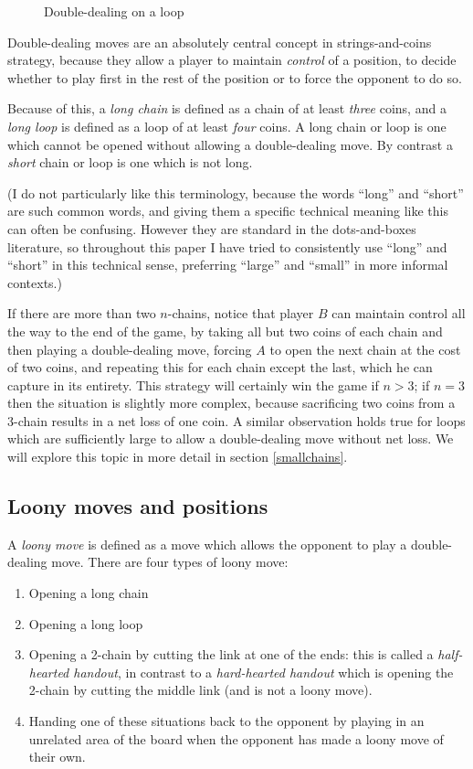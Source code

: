\documentclass[a4paper,twocolumn]{article}
\begin{document}
\begin{figure}
  \centering
  \def\svgscale{0.7}
  
  \caption{Double-dealing on a loop}
  \label{loopdoubledeal}
\end{figure}

Double-dealing moves are an absolutely central concept in
strings-and-coins strategy, because they allow a player to maintain
\emph{control} of a position, to decide whether to play first in the
rest of the position or to force the opponent to do so.

Because of this, a \emph{long chain} is defined as a chain of at least
\emph{three} coins, and a \emph{long loop} is defined as a loop of at
least \emph{four} coins. A long chain or loop is one which cannot be
opened without allowing a double-dealing move. By contrast a
\emph{short} chain or loop is one which is not long.

(I do not particularly like this terminology, because the words
``long'' and ``short'' are such common words, and giving them a
specific technical meaning like this can often be confusing. However
they are standard in the dots-and-boxes literature, so throughout this
paper I have tried to consistently use ``long'' and ``short'' in this
technical sense, preferring ``large'' and ``small'' in more informal
contexts.)

If there are more than two $n$-chains, notice that player $B$ can
maintain control all the way to the end of the game, by taking all but
two coins of each chain and then playing a double-dealing move,
forcing $A$ to open the next chain at the cost of two coins, and
repeating this for each chain except the last, which he can capture in
its entirety. This strategy will certainly win the game if $n>3$; if
$n=3$ then the situation is slightly more complex, because sacrificing
two coins from a 3-chain results in a net loss of one coin. A similar
observation holds true for loops which are sufficiently large to allow
a double-dealing move without net loss. We will explore this topic in
more detail in section \ref{smallchains}.

\subsection{Loony moves and positions}

A \emph{loony move} is defined as a move which allows the opponent to
play a double-dealing move. There are four types of loony move:

\begin{enumerate}
  \item Opening a long chain
  \item Opening a long loop
  \item Opening a 2-chain by cutting the link at one of the ends:
    this is called a \emph{half-hearted handout}, in contrast to a
    \emph{hard-hearted handout} which is opening the 2-chain by
    cutting the middle link (and is not a loony move).
  \item Handing one of these situations back to the opponent by
    playing in an unrelated area of the board when the opponent has
    made a loony move of their own.
\end{enumerate}
\end{document}
